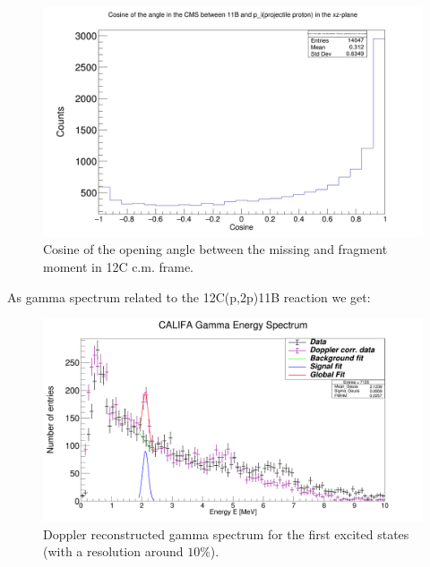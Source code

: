 \documentclass{report}
\begin{document}
\newline
\begin{figure}[!htb]
  \includegraphics[width=\linewidth]{cos_11B_p_i.png}
  \caption{Cosine of the opening angle between the missing and fragment moment in 12C c.m. frame.}
  \label{fig:11b_p_i_distr}
\end{figure}
\newline
\newpage

As gamma spectrum related to the 12C(p,2p)11B reaction we get:\newline
\begin{figure}[!htb]
  \includegraphics[width=\linewidth]{gamma_spec.png}
  \caption{Doppler reconstructed gamma spectrum for the first excited states (with a resolution around $10\%$).}
\end{figure}
\newline
\end{document}
